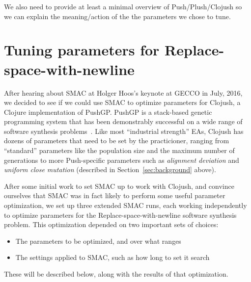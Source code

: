 We also need to provide at least a minimal overview of Push/Plush/Clojush so
we can explain the meaning/action of the the parameters we chose to tune. 

\section{Tuning parameters for Replace-space-with-newline}
\label{sec:tuningRSWN}



After hearing about SMAC at Holger Hoos's keynote at GECCO in July, 2016, we
decided to see if we could use SMAC to optimize parameters for Clojush, a
Clojure implementation of PushGP. PushGP is a stack-based genetic programming
system that has been demonstrably successful on a wide range of software
synthesis problems~\cite{Helmuth:2015:GECCO}. Like most ``industrial
strength'' EAs, Clojush has dozens of parameters that need to be set by the
practicioner, ranging from ``standard'' parameters like the population size
and the maximum number of generations to more Push-specific parameters
such as \emph{alignment deviation} and \emph{uniform close mutation} (described
in Section~\ref{sec:background} above).

After some initial work to set SMAC up to work with Clojush, and convince
ourselves that SMAC was in fact likely to perform some useful parameter
optimization, we set up three extended SMAC runs, each working independently
to optimize parameters for the Replace-space-with-newline software synthesis 
problem.
This optimization depended on two important sets of choices:
\begin{itemize}
	\item The parameters to be optimized, and over what ranges
	\item The settings applied to SMAC, such as how long to set it search
\end{itemize}
These will be described below, along with the results of that optimization.

